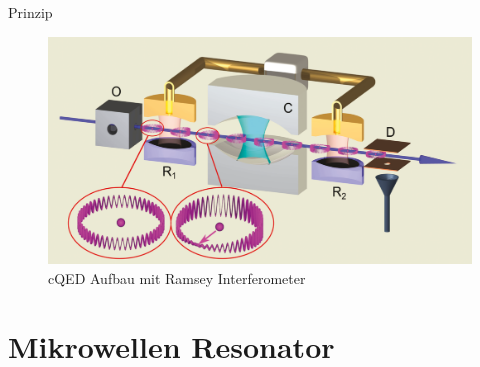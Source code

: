 \documentclass{beamer}
\begin{document}
\begin{frame}{Prinzip}
	\begin{figure}
		\center\includegraphics[width=1\textwidth]{images/aufbau.png}
		\caption{cQED Aufbau mit Ramsey Interferometer\cite{lect}}
	\end{figure}
\end{frame}
\section{Mikrowellen Resonator}
\end{document}

